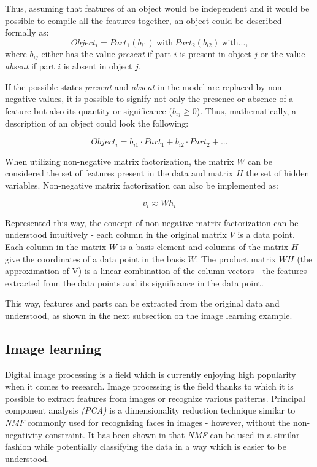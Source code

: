 \documentclass[thesis=M,english]{FITthesis}[2012/10/20]
\begin{document}
Thus, assuming that features of an object would be independent and it would be
possible to compile all the features together, an object could be described
formally as:
\begin{equation}
  Object_{i} = Part_{1}(b_{i1})~\text{with}~Part_{2}(b_{i2})~\text{with...,}
\end{equation}
where $b_{ij}$ either has the value \emph{present} if part $i$ is present in object $j$ or
the value \emph{absent} if part $i$ is absent in object $j$.

If the possible states \emph{present} and \emph{absent} in the model are
replaced by non-negative values, it is possible to signify not only the
presence or absence of a feature but also its quantity or significance
($b_{ij} \geq 0$). Thus, mathematically, a description of an object could
look the following: 

\begin{equation}
  Object_{i} = b_{i1} \cdot Part_{1} + b_{i2} \cdot Part_{2} + ...
\end{equation}\cite{nmf-phd-thesis}

When utilizing non-negative matrix factorization, the matrix $W$ can be
considered the set of features present in the data and matrix $H$ the set
of hidden variables. Non-negative matrix factorization can also be implemented
as:

\begin{equation}
  v_{i} \approx Wh_{i}
\end{equation}

Represented this way, the concept of non-negative matrix factorization can
be understood intuitively - each column in the original matrix $V$ is a data point.
Each column in the matrix $W$ is a basis element and columns of the matrix $H$ give the
coordinates of a data point in the basis $W$. The product matrix $WH$ (the approximation
of V) is a linear combination of the column vectors - the features extracted from
the data points and its significance in the data point.

This way, features and parts can be extracted from
the original data and understood, as shown in the next subsection on the
image learning example.


\subsection{Image learning}
Digital image processing is a field which is currently enjoying high
popularity when it comes to research. Image processing is the field thanks
to which it is possible to extract features from images or recognize
various patterns. Principal component analysis \emph{(PCA)} is a dimensionality
reduction technique similar to \emph{NMF} commonly used for recognizing
faces in images \cite{pca-facial} - however, without the non-negativity constraint.
It has been shown in \cite{lee99} that \emph{NMF} can be used in a similar
fashion while potentially classifying the data in a way which is easier to be understood.
\end{document}
